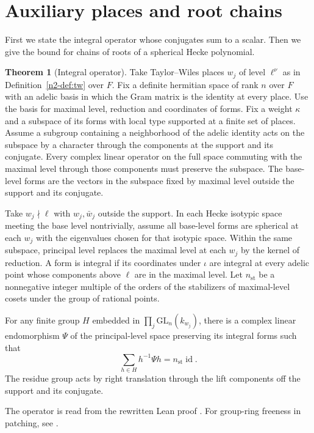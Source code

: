 \documentclass[reqno]{amsart}
\theoremstyle{definition}
\newtheorem{theorem}{Theorem}[section]
\newcommand{\GL}{\mathrm{GL}}
\begin{document}
\section{Auxiliary places and root chains}\label{sec:auxiliary}

First we state the integral operator whose conjugates sum to a scalar. Then we give the bound for chains of roots of a spherical Hecke polynomial.

\begin{theorem}[Integral operator]\label{thm:higman}
Take Taylor--Wiles places \(w_j\) of level \(\ell^\nu\) as in Definition~\ref{n2-def:tw} over \(F\).  Fix a definite hermitian space of rank \(n\) over \(F\) with an adelic basis in which the Gram matrix is the identity at every place.  Use the basis for maximal level, reduction and coordinates of forms.  Fix a weight \(\kappa\) and a subspace of its forms with local type supported at a finite set of places.  Assume a subgroup containing a neighborhood of the adelic identity acts on the subspace by a character through the components at the support and its conjugate.  Every complex linear operator on the full space commuting with the maximal level through those components must preserve the subspace.  The base-level forms are the vectors in the subspace fixed by maximal level outside the support and its conjugate.

Take \(w_j\nmid\ell\) with \(w_j,\bar w_j\) outside the support.  In each Hecke isotypic space meeting the base level nontrivially, assume all base-level forms are spherical at each \(w_j\) with the eigenvalues chosen for that isotypic space.  Within the same subspace, principal level replaces the maximal level at each \(w_j\) by the kernel of reduction.  A form is integral if its coordinates under \(\iota\) are integral at every adelic point whose components above \(\ell\) are in the maximal level.  Let \(n_{\mathrm{st}}\) be a nonnegative integer multiple of the orders of the stabilizers of maximal-level cosets under the group of rational points.

For any finite group \(H\) embedded in \(\prod_j\GL_n(k_{w_j})\), there is a complex linear endomorphism \(\Psi\) of the principal-level space preserving its integral forms such that
\[
 \sum_{h\in H}h^{-1}\Psi h=n_{\mathrm{st}}\operatorname{id}.
\]
The residue group acts by right translation through the lift components off the support and its conjugate.
\end{theorem}
The operator is read from the rewritten Lean proof \cite{GL}.  For group-ring freeness in patching, see \cite{TW,CHT}.
\end{document}
